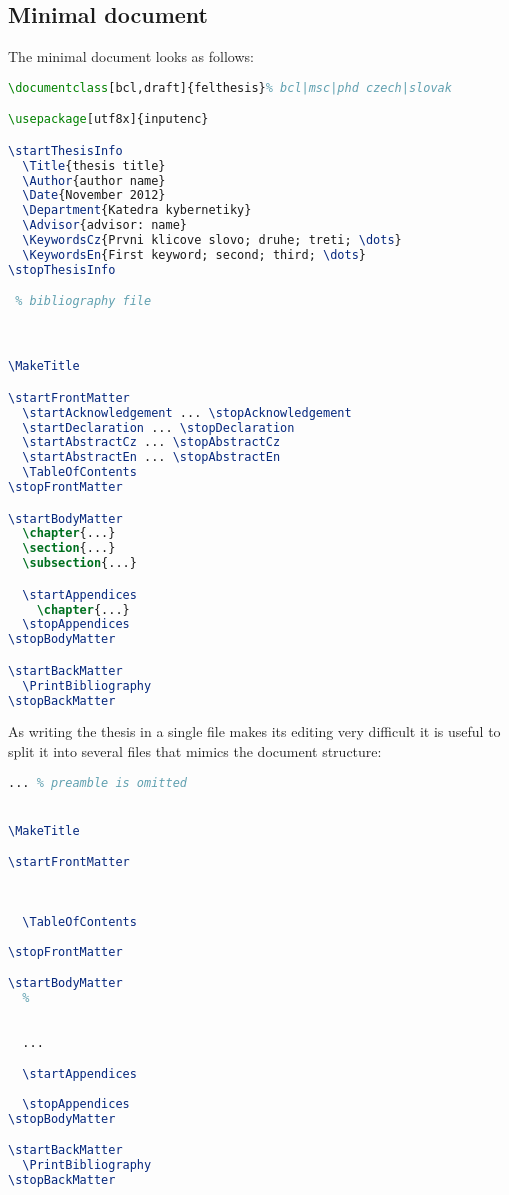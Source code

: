\subsection{Minimal document}
The minimal \FelThesis{} document looks as follows:

\begin{lstlisting}[language=TeX]
\documentclass[bcl,draft]{felthesis}% bcl|msc|phd czech|slovak

\usepackage[utf8x]{inputenc}

\startThesisInfo
  \Title{thesis title}
  \Author{author name}
  \Date{November 2012}
  \Department{Katedra kybernetiky}
  \Advisor{advisor: name}
  \KeywordsCz{Prvni klicove slovo; druhe; treti; \dots}
  \KeywordsEn{First keyword; second; third; \dots}
\stopThesisInfo

 % bibliography file



\MakeTitle

\startFrontMatter
  \startAcknowledgement ... \stopAcknowledgement
  \startDeclaration ... \stopDeclaration
  \startAbstractCz ... \stopAbstractCz
  \startAbstractEn ... \stopAbstractEn
  \TableOfContents
\stopFrontMatter

\startBodyMatter
  \chapter{...}
  \section{...}
  \subsection{...}

  \startAppendices
    \chapter{...}
  \stopAppendices
\stopBodyMatter

\startBackMatter
  \PrintBibliography
\stopBackMatter


\end{lstlisting}

As writing the thesis in a single file makes its editing very
difficult it is useful to split it into several files that mimics the
document structure:
\begin{lstlisting}[language=TeX]
... % preamble is omitted


\MakeTitle

\startFrontMatter
  
  
  
  \TableOfContents
  
\stopFrontMatter

\startBodyMatter
  %
  
  
  ...

  \startAppendices
    
  \stopAppendices
\stopBodyMatter

\startBackMatter
  \PrintBibliography
\stopBackMatter


\end{lstlisting}

